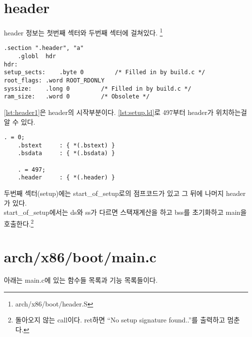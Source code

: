 \documentclass[a4paper,11pt]{report}
\begin{document}
\begin{CJK}{UTF8}{}
\section{header} %
header 정보는 첫번째 섹터와 두번째 섹터에 걸쳐있다. \footnote{arch/x86/boot/header.S}\\
\begin{lstlisting}[label=lst:header1,caption=arch/x86/boot/header.S]
	.section ".header", "a"
	.globl	hdr
hdr:
setup_sects:	.byte 0			/* Filled in by build.c */
root_flags:	.word ROOT_RDONLY
syssize:	.long 0			/* Filled in by build.c */
ram_size:	.word 0			/* Obsolete */
\end{lstlisting}

\autoref{lst:header1}은 header의 시작부분이다. \autoref{lst:setup.ld}로 497부터 header가 위치하는걸 알 수 있다.

\begin{lstlisting}[label=lst:setup.ld,caption=arch/x86/boot/setup.ld]
	. = 0;
	.bstext		: { *(.bstext) }
	.bsdata		: { *(.bsdata) }

	. = 497;
	.header		: { *(.header) }
\end{lstlisting}


두번째 섹터(setup)에는 start\_of\_setup로의 점프코드가 있고 그 뒤에 나머지 header가 있다.\\
start\_of\_setup에서는 ds와 ss가 다르면 스택재계산을 하고 bss를 초기화하고 main을 호출한다.\footnote{돌아오지 않는 call이다. ret하면 ``No setup signature found..''를 출력하고 멈춘다.}

\section{arch/x86/boot/main.c}
아래는 main.c에 있는 함수들 목록과 기능 목록들이다.\\


\end{CJK}
\end{document}
